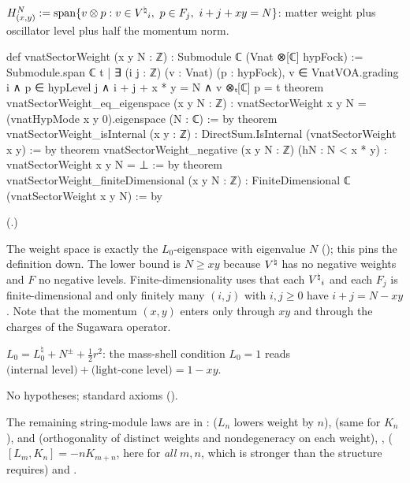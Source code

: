 \begin{definition}\label{ch18:def:sectorweight}
$H^N_{(x,y)}:=\operatorname{span}\{v\otimes p: v\in{V^{\natural}}_i,\ p\in F_j,\ i+j+xy=N\}$: matter weight plus
oscillator level plus half the momentum norm.
\end{definition}
\begin{leancode}
def vnatSectorWeight (x y N : ℤ) : Submodule ℂ (Vnat ⊗[ℂ] hypFock) :=
  Submodule.span ℂ {t | ∃ (i j : ℤ) (v : Vnat) (p : hypFock),
    v ∈ VnatVOA.grading i ∧ p ∈ hypLevel j ∧ i + j + x * y = N ∧ v ⊗ₜ[ℂ] p = t}
theorem vnatSectorWeight_eq_eigenspace (x y N : ℤ) :
    vnatSectorWeight x y N = (vnatHypMode x y 0).eigenspace (N : ℂ) := by
theorem vnatSectorWeight_isInternal (x y : ℤ) :
    DirectSum.IsInternal (vnatSectorWeight x y) := by
theorem vnatSectorWeight_negative (x y N : ℤ) (hN : N < x * y) :
    vnatSectorWeight x y N = ⊥ := by
theorem vnatSectorWeight_finiteDimensional (x y N : ℤ) :
    FiniteDimensional ℂ (vnatSectorWeight x y N) := by
\end{leancode}
(.)
\begin{dictionary}
The weight space is exactly the $L_0$-eigenspace with eigenvalue $N$ (); this
pins the definition down.  The lower bound is $N\ge xy$ because ${V^{\natural}}$ has no negative weights and $F$ no
negative levels.  Finite-dimensionality uses that each ${V^{\natural}}_i$ and each $F_j$ is finite-dimensional and
only finitely many $(i,j)$ with $i,j\ge0$ have $i+j=N-xy$.  Note that the momentum $(x,y)$ enters only
through $xy$ and through the charges of the Sugawara operator.
\end{dictionary}
\begin{physics}
$L_0=L_0^\natural+N^{\pm}+\frac12r^2$: the mass-shell condition $L_0=1$ reads
$\text{(internal level)}+\text{(light-cone level)}=1-xy$.
\end{physics}
\begin{status}No hypotheses; standard axioms ().\end{status}

The remaining string-module laws are in :
 ($L_n$ lowers weight by $n$),  (same for
$K_n$),  and  (orthogonality of
distinct weights and nondegeneracy on each weight), ,
 ($[L_m,K_n]=-nK_{m+n}$, here for \emph{all} $m,n$, which is stronger
than the structure requires) and .

